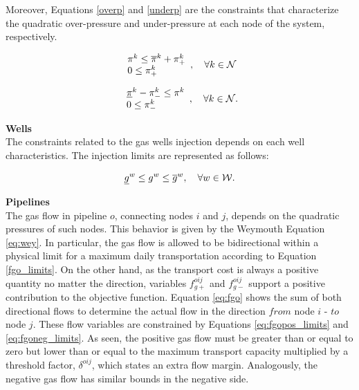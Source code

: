 Moreover, Equations \ref{overp} and \ref{underp} are the constraints that characterize the quadratic over-pressure and under-pressure at each node of the system, respectively. 

\begin{equation}
\begin{array}{l}
 \pi^{k} \le \overline{\pi}^{k} + \pi^{k}_{+}\\
 0 \le \pi^{k}_{+}\\
\end{array} 
,\quad \forall k  \in {\cal{N}}\\ 
\label{overp}
\end{equation}

\begin{equation}
\begin{array}{l}
\underline{\pi}^{k} - \pi^{k}_{-} \le \pi^{k}\\
0 \le \pi^{k}_{-}\\
\end{array} 
,\quad \forall k  \in {\cal{N}}.\\ 
\label{underp}
\vspace{0.3cm}
\end{equation}

\noindent \textbf{Wells}\\

The constraints related to the gas wells injection depends on each well characteristics. The injection limits are represented as follows:

\begin{equation}
\underline{g}^{w} \le g^{w} \le \overline{g}^{w}, \quad \forall w \in \cal{W}.
\label{eq:g_limits}
\end{equation}

\noindent \textbf{Pipelines} \\

The gas flow in pipeline $o$, connecting nodes $i$ and $j$, depends on the quadratic pressures of such nodes. This behavior is given by the Weymouth Equation \ref{eq:wey}. In particular, the gas flow is allowed to be bidirectional within a physical limit for a maximum daily transportation according to Equation \ref{fgo_limits}. On the other hand, as the transport cost is always a positive quantity no matter the direction, variables $f^{oij}_{g+}$ and $f^{oij}_{g-}$ support a positive contribution to the objective function. Equation \ref{eq:fgo} shows the sum of both directional flows to determine the actual flow in the direction $from$  node $i$ - $to$ node $j$. These flow variables are constrained by Equations \ref{eq:fgopos_limits} and \ref{eq:fgoneg_limits}. As seen, the positive gas flow must be greater than or equal to zero but lower than or equal to the maximum transport capacity multiplied by a threshold factor, $\delta^{oij}$, which states an extra flow margin. Analogously, the negative gas flow has similar bounds in the negative side.


